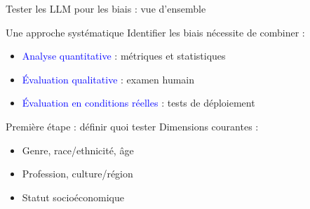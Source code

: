 \begin{frame}{Tester les LLM pour les biais : vue d'ensemble}

    \begin{block}{Une approche systématique}
        \medskip
        Identifier les biais nécessite de combiner :
        \begin{itemize}
            \item<+-> \textcolor{blue}{Analyse quantitative} : métriques et statistiques
            \item<+-> \textcolor{blue}{Évaluation qualitative} : examen humain
            \item<+-> \textcolor{blue}{Évaluation en conditions réelles} : tests de déploiement
        \end{itemize}
    \end{block}

    \bigskip

    \begin{overprint}
        \begin{block}{Première étape : définir quoi tester}
            \medskip
            Dimensions courantes :
            \begin{itemize}
                \item Genre, race/ethnicité, âge
                \item Profession, culture/région
                \item Statut socioéconomique
            \end{itemize}
        \end{block}
    \end{overprint}

\end{frame}


